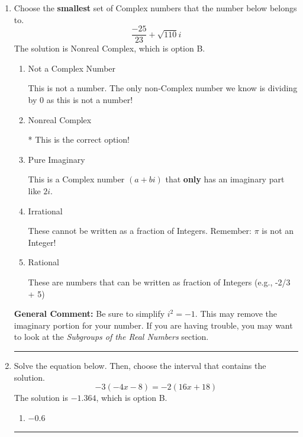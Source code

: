 \documentclass{extbook}[14pt]
\newcommand{\litem}[1]{\item #1

\rule{\textwidth}{0.4pt}}
\begin{document}
\begin{enumerate}
{\begin{enumerate}[label=\Alph*.]
 These are the counting numbers with 0 (0, 1, 2, 3, ...)
\item Irrational

 These cannot be written as a fraction of Integers.
\item Rational

 These are numbers that can be written as fraction of Integers (e.g., -2/3)
\item Integer

* This is the correct option!
\end{enumerate}


\textbf{General Comment:} First, you \textbf{NEED} to simplify the expression. This question simplifies to $-308$. 
 
 Be sure you look at the simplified fraction and not just the decimal expansion. Numbers such as 13, 17, and 19 provide \textbf{long but repeating/terminating decimal expansions!} 
 
 The only ways to *not* be a Real number are: dividing by 0 or taking the square root of a negative number. 
 
 Irrational numbers are more than just square root of 3: adding or subtracting values from square root of 3 is also irrational.
}
\litem{
Choose the \textbf{smallest} set of Complex numbers that the number below belongs to.
\[ \frac{-25}{23}+\sqrt{110} i \]The solution is Nonreal Complex, which is option B.

\begin{enumerate}[label=\Alph*.]
\item Not a Complex Number

 This is not a number. The only non-Complex number we know is dividing by 0 as this is not a number!
\item Nonreal Complex

* This is the correct option!
\item Pure Imaginary

 This is a Complex number $(a+bi)$ that \textbf{only} has an imaginary part like $2i$.
\item Irrational

 These cannot be written as a fraction of Integers. Remember: $\pi$ is not an Integer!
\item Rational

 These are numbers that can be written as fraction of Integers (e.g., -2/3 + 5)
\end{enumerate}


\textbf{General Comment:} Be sure to simplify $i^2 = -1$. This may remove the imaginary portion for your number. If you are having trouble, you may want to look at the \textit{Subgroups of the Real Numbers} section.
}
\litem{
Solve the equation below. Then, choose the interval that contains the solution.
\[ -3(-4x -8) = -2(16x + 18) \]The solution is \( -1.364 \), which is option B.\begin{enumerate}[label=\Alph*.]
\item \( -0.6 \)


\end{enumerate}}
\end{enumerate}
\end{document}
